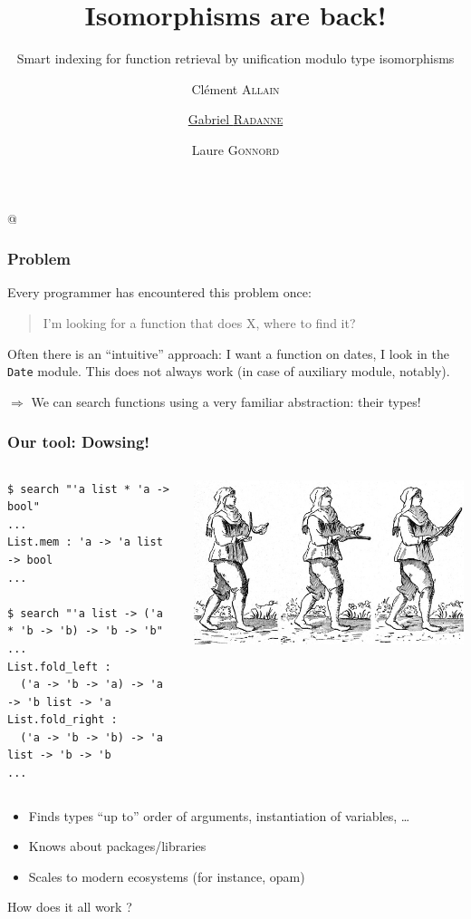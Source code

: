 \documentclass[aspectratio=169,dvipsnames,svgnames,10pt]{beamer}
\title{Isomorphisms are back!}
\subtitle{Smart indexing for function retrieval by unification modulo type isomorphisms}
\author{
  Clément \textsc{Allain}
  \and
  \underline{Gabriel \textsc{Radanne}}
  \and
  Laure \textsc{Gonnord} \\
}
\date{}
\begin{document}
\lstMakeShortInline[keepspaces,basicstyle=\small\ttfamily]@

\begin{frame}
  \titlepage
\end{frame}

\begin{frame}[fragile]
  \frametitle{Problem}

  Every programmer has encountered this problem once:

  \begin{quotation}
    I'm looking for a function that does X, where to find it?
  \end{quotation}

  Often there is an ``intuitive'' approach: I want a function
  on dates, I look in the {\color{orange}\tt Date} module.
  This does not always work (in case of auxiliary module, notably).

  \pause
  $\Rightarrow$ We can search functions using a very familiar abstraction: their types!
  
\end{frame}

\begin{frame}[fragile]
  \frametitle{Our tool: Dowsing!}
  \begin{columns}
    \footnotesize
\begin{verbatim}
$ search "'a list * 'a -> bool"
...
List.mem : 'a -> 'a list -> bool
...

$ search "'a list -> ('a * 'b -> 'b) -> 'b -> 'b"
...
List.fold_left :
  ('a -> 'b -> 'a) -> 'a -> 'b list -> 'a
List.fold_right :
  ('a -> 'b -> 'b) -> 'a list -> 'b -> 'b
...
\end{verbatim}
    \includegraphics{sourcier}
  \end{columns}

  \vfill
  
\begin{itemize}
\item Finds types ``up to'' order of arguments, instantiation of variables, \dots
\item Knows about packages/libraries
\item Scales to modern ecosystems (for instance, opam)
\end{itemize}
\pause
How does it all work ?
\end{frame}
\end{document}
